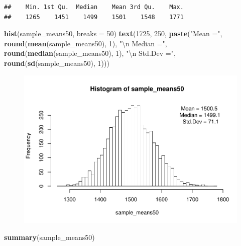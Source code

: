 \documentclass[]{article}
\newenvironment{Shaded}{\begin{snugshade}}{\end{snugshade}}
\newcommand{\KeywordTok}[1]{\textcolor[rgb]{0.13,0.29,0.53}{\textbf{{#1}}}}
\newcommand{\DataTypeTok}[1]{\textcolor[rgb]{0.13,0.29,0.53}{{#1}}}
\newcommand{\DecValTok}[1]{\textcolor[rgb]{0.00,0.00,0.81}{{#1}}}
\newcommand{\CharTok}[1]{\textcolor[rgb]{0.31,0.60,0.02}{{#1}}}
\newcommand{\StringTok}[1]{\textcolor[rgb]{0.31,0.60,0.02}{{#1}}}
\newcommand{\NormalTok}[1]{{#1}}
\begin{document}
\begin{verbatim}
##    Min. 1st Qu.  Median    Mean 3rd Qu.    Max. 
##    1265    1451    1499    1501    1548    1771
\end{verbatim}

\begin{Shaded}
\begin{Highlighting}[]
\KeywordTok{hist}\NormalTok{(sample_means50, }\DataTypeTok{breaks =} \DecValTok{50}\NormalTok{)}
\KeywordTok{text}\NormalTok{(}\DecValTok{1725}\NormalTok{, }\DecValTok{250}\NormalTok{, }\KeywordTok{paste}\NormalTok{(}\StringTok{"Mean ="}\NormalTok{, }\KeywordTok{round}\NormalTok{(}\KeywordTok{mean}\NormalTok{(sample_means50), }\DecValTok{1}\NormalTok{), }\StringTok{"}\CharTok{\textbackslash{}n}\StringTok{ Median ="}\NormalTok{, }
         \KeywordTok{round}\NormalTok{(}\KeywordTok{median}\NormalTok{(sample_means50), }\DecValTok{1}\NormalTok{), }\StringTok{"}\CharTok{\textbackslash{}n}\StringTok{ Std.Dev ="}\NormalTok{, }\KeywordTok{round}\NormalTok{(}\KeywordTok{sd}\NormalTok{(sample_means50), }\DecValTok{1}\NormalTok{)))}
\end{Highlighting}
\end{Shaded}

\begin{figure}[htbp]
\centering
\includegraphics{Lab3A_files/figure-latex/SamplingDistPlot-1.pdf}
\caption{}
\end{figure}

\begin{Shaded}
\begin{Highlighting}[]
\KeywordTok{summary}\NormalTok{(sample_means50)}
\end{Highlighting}
\end{Shaded}
\end{document}
